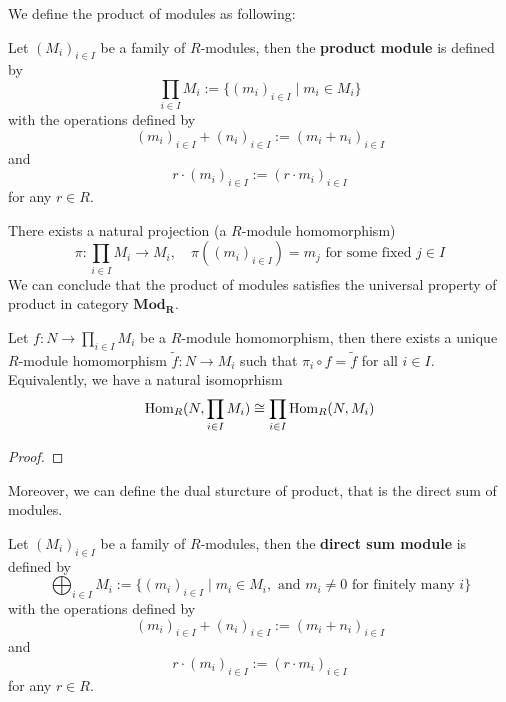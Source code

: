 We define the product of modules as following:
\begin{definition}
    Let \((M_i)_{i \in I}\) be a family of \(R\)-modules, then the \textbf{product module} is defined by
    \[\prod_{i \in I} M_i := \{(m_i)_{i \in I} \mid m_i \in M_i\}\]
    with the operations defined by
    \[(m_i)_{i \in I} + (n_i)_{i \in I} := (m_i + n_i)_{i \in I}\]
    and
    \[r \cdot (m_i)_{i \in I} := (r \cdot m_i)_{i \in I}\]
    for any \(r \in R\).\\
\end{definition}
    There exists a natural projection (a \(R\)-module homomorphism) \[\pi: \prod_{i \in I} M_i \to M_i, \quad \pi((m_i)_{i \in I}) = m_j \text{ for some fixed } j \in I\]
    We can conclude that the product of modules satisfies the universal property of product in category \(\mathbf{Mod_R}\).
    \begin{proposition}
        Let \(f: N \to \prod_{i \in I} M_i\) be a \(R\)-module homomorphism, then there exists a unique \(R\)-module homomorphism \(\tilde{f}: N \to M_i\) such that \(\pi_i \circ f = \tilde{f}\) for all \(i \in I\). Equivalently, we have a natural isomoprhism
        \[\operatorname{Hom}_R(N, \prod_{i \in I} M_i) \cong \prod_{i \in I} \operatorname{Hom}_R(N, M_i)\]
    \end{proposition}
    \begin{proof}
        
    \end{proof}

    Moreover, we can define the dual sturcture of product, that is the direct sum of modules.
    \begin{definition}
        Let \((M_i)_{i \in I}\) be a family of \(R\)-modules, then the \textbf{direct sum module} is defined by
        \[\bigoplus_{i \in I} M_i := \{(m_i)_{i \in I} \mid m_i \in M_i, \text{ and } m_i \neq 0 \text{ for finitely many } i\}\]
        with the operations defined by
        \[(m_i)_{i \in I} + (n_i)_{i \in I} := (m_i + n_i)_{i \in I}\]
        and
        \[r \cdot (m_i)_{i \in I} := (r \cdot m_i)_{i \in I}\]
        for any \(r \in R\).\\
    \end{definition}

